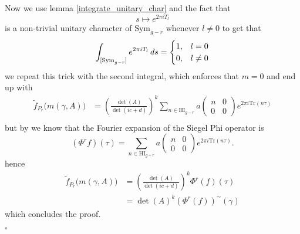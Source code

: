 Now we use lemma \ref{integrate_unitary_char} and the fact that 
\[s\mapsto  e^{2\pi iT_l} \]
is a non-trivial unitary character of \(\mathrm{Sym}_{g-r}\) whenever \(l\neq 0\) to get that 
\[\int^{}_{[\mathrm{Sym}_{g-r}]}  e^{2\pi iT_l}  \,ds = \begin{cases}
	1, & l=0 \\
	0, & l\neq 0
\end{cases}\]
we repeat this trick with the second integral, which enforces that \(m = 0\) and end up with 
\begin{align*}
	\tilde f_{P_r}\bigl(m(\gamma, A)\bigr)
	&=\left(\frac{\det(A)}{\det(ic + d)}\right)^{k} \sum_{n\in\mathrm{HI}_{g-r}} a\begin{pmatrix} n & 0\\ 0 & 0 \end{pmatrix}e^{2\pi i \mathrm{Tr} (n\tau)}\\
\end{align*}
but by \cite[3.5]{bruinier123ModularForms2008} we know that the Fourier expansion of the Siegel Phi operator is 
\[(\Phi^{r} f)(\tau) = \sum_{n\in\mathrm{HI}_{g-r}} a\begin{pmatrix} n & 0\\ 0 & 0 \end{pmatrix} e^{2\pi i\mathrm{Tr}(n \tau)}.\]
hence 
\begin{align*}
	\tilde f_{P_r}\bigl(m(\gamma, A)\bigr)
	&=\left(\frac{\det(A)}{\det(ic + d)}\right)^{k} \Phi^r(f)(\tau)\\
	&= \det(A)^k (\Phi^r(f))^{\sim}(\gamma)
\end{align*}
which concludes the proof.
\begin{FlushRight}
	\(\square\)
\end{FlushRight}